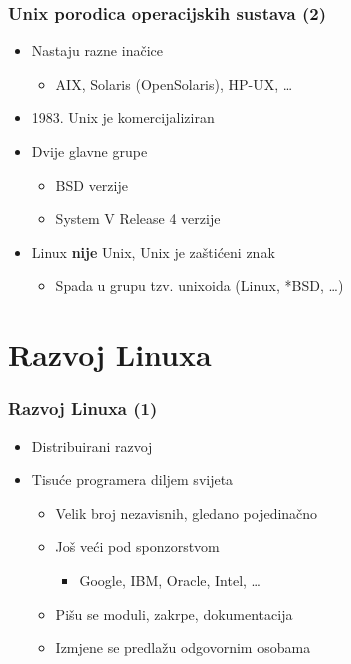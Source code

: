 \documentclass{beamer}
\begin{document}
\begin{frame}[t]
\frametitle{Unix porodica operacijskih sustava (2)}
\begin{itemize}
  \item Nastaju razne inačice
  \begin{itemize}
    \item AIX, Solaris (OpenSolaris), HP-UX, \ldots
  \end{itemize}
  \item 1983. Unix je komercijaliziran
  \item Dvije glavne grupe
  \begin{itemize}
    \item BSD verzije
    \item System V Release 4 verzije
  \end{itemize}
  \item Linux \textbf{nije} Unix, Unix je zaštićeni znak
  \begin{itemize}
    \item Spada u grupu tzv. unixoida (Linux, *BSD, \ldots)
  \end{itemize}
\end{itemize}
\end{frame}

\section{Razvoj Linuxa}
\begin{frame}[t]
\frametitle{Razvoj Linuxa (1)}
\begin{itemize}
  \item Distribuirani razvoj
  \item Tisuće programera diljem svijeta
  \begin{itemize}
    \item Velik broj nezavisnih, gledano pojedinačno
    \item Još veći pod sponzorstvom
    \begin{itemize}
      \item Google, IBM, Oracle, Intel, \ldots
    \end{itemize}
  \item Pišu se moduli, zakrpe, dokumentacija
  \item Izmjene se predlažu odgovornim osobama
  \end{itemize}
\end{itemize}
\end{frame}
\end{document}
